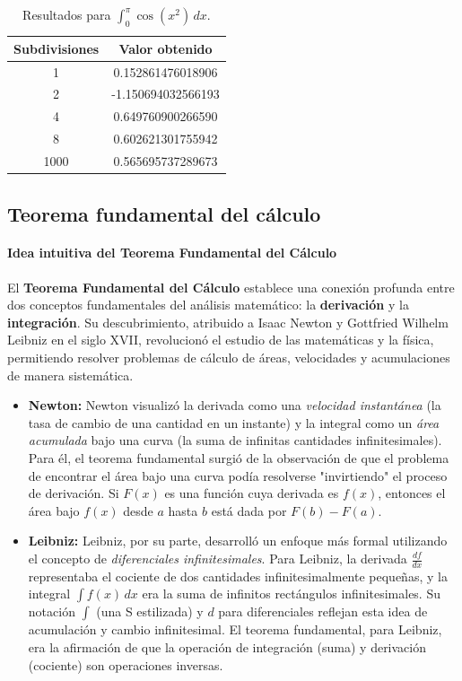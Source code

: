 \documentclass[12pt, a4paper]{article}
\theoremstyle{rioplatense}
\begin{document}
\begin{table}[h]
\centering
\caption{Resultados para \(\int_0^\pi \cos(x^2) \, dx\).}
\begin{tabular}{cc}
\toprule
\textbf{Subdivisiones} & \textbf{Valor obtenido} \\
\midrule
1 & 0.152861476018906 \\
2 & -1.150694032566193 \\
4 & 0.649760900266590 \\
8 & 0.602621301755942 \\
1000 & 0.565695737289673 \\
\bottomrule
\end{tabular}
\end{table}

\clearpage

\newpage

\subsection{Teorema fundamental del cálculo}

\paragraph{Idea intuitiva del Teorema Fundamental del Cálculo}

El \textbf{Teorema Fundamental del Cálculo} establece una conexión profunda entre dos conceptos fundamentales del análisis matemático: la \textbf{derivación} y la \textbf{integración}. Su descubrimiento, atribuido a Isaac Newton y Gottfried Wilhelm Leibniz en el siglo XVII, revolucionó el estudio de las matemáticas y la física, permitiendo resolver problemas de cálculo de áreas, velocidades y acumulaciones de manera sistemática.

\begin{itemize}
    \item \textbf{Newton:}
    Newton visualizó la derivada como una \textit{velocidad instantánea} (la tasa de cambio de una cantidad en un instante) y la integral como un \textit{área acumulada} bajo una curva (la suma de infinitas cantidades infinitesimales). Para él, el teorema fundamental surgió de la observación de que el problema de encontrar el área bajo una curva podía resolverse "invirtiendo" el proceso de derivación. Si \( F(x) \) es una función cuya derivada es \( f(x) \), entonces el área bajo \( f(x) \) desde \( a \) hasta \( b \) está dada por \( F(b) - F(a) \).

    \item \textbf{Leibniz:}
    Leibniz, por su parte, desarrolló un enfoque más formal utilizando el concepto de \textit{diferenciales infinitesimales}. Para Leibniz, la derivada \( \frac{df}{dx} \) representaba el cociente de dos cantidades infinitesimalmente pequeñas, y la integral \( \int f(x) \, dx \) era la suma de infinitos rectángulos infinitesimales. Su notación \( \int \) (una S estilizada) y \( d \) para diferenciales reflejan esta idea de acumulación y cambio infinitesimal. El teorema fundamental, para Leibniz, era la afirmación de que la operación de integración (suma) y derivación (cociente) son operaciones inversas.
\end{itemize}
\end{document}
